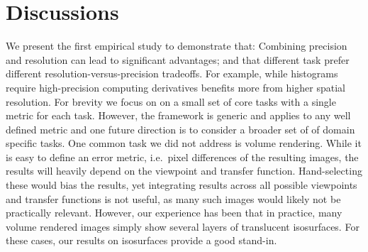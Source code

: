 \section{Discussions}

We present the first empirical study to demonstrate that: Combining precision and resolution can lead to significant advantages; and that different task prefer different resolution-versus-precision tradeoffs. 
For example, while histograms require high-precision computing derivatives benefits more from higher spatial resolution.
For brevity we focus on on a small set of core tasks with a single metric for each task. 
However, the framework is generic and applies to any well defined metric and one future direction is to consider a broader set of of domain specific tasks. 
One common task we did not address is volume rendering. 
While it is easy to define an error metric, i.e.\ pixel differences of the resulting images, the results will heavily depend on the viewpoint and transfer function.
Hand-selecting these would bias the results, yet integrating results across all possible viewpoints and transfer functions is not useful, as many such images would likely not be practically relevant. 
However, our experience has been that in practice, many volume rendered images simply show several layers of translucent isosurfaces. 
For these cases, our results on isosurfaces provide a good stand-in.


